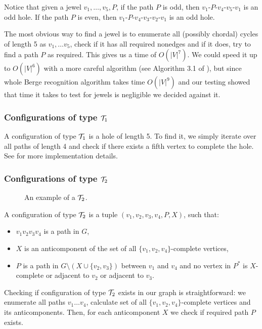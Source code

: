 Notice that given a jewel $v_1, \ldots, v_5, P$, if the path $P$ is odd, then $v_1$-$P$-$v_4$-$v_5$-$v_1$ is an odd hole. If the path $P$ is even, then $v_1$-$P$-$v_4$-$v_3$-$v_2$-$v_1$ is an odd hole.

The most obvious way to find a jewel is to enumerate all (possibly chordal) cycles of length 5 as $v_1, \ldots v_5$, check if it has all required nonedges and if it does, try to find a path $P$ as required. This gives us a time of $O(|V|^7)$. We could speed it up to $O(|V|^6)$ with a more careful algorithm (see Algorithm 3.1 of \cite{MC05}), but since whole Berge recognition algorithm takes time $O(|V|^9)$ and our testing showed that time it takes to test for jewels is negligible we decided against it.

\subsubsection{Configurations of type $\mathcal{T}_1$}

A configuration of type $\mathcal{T}_1$ is a hole of length 5. To find it, we simply iterate over all paths of length 4 and check if there exists a fifth vertex to complete the hole. See  for more implementation details.

\subsubsection{Configurations of type $\mathcal{T}_2$}

\begin{wrapfigure}{r}{0.35\textwidth}
	
	\caption{An example of a $\mathcal{T}_2$.}%
	\vspace{-.5cm}
\end{wrapfigure}

A configuration of type $\mathcal{T}_2$ is a tuple $(v_1, v_2, v_3, v_4, P, X)$, such that:
\begin{itemize}
	\item $v_1v_2v_3v_4$ is a path in $G$,
	\item $X$ is an anticomponent of the set of all $\{v_1, v_2, v_4\}$-complete vertices,
	\item $P$ is a path in $G\setminus(X \cup \{v_2, v_3\})$ between $v_1$ and $v_4$ and no vertex in $P^*$ is $X$-complete or adjacent to $v_2$ or adjacent to $v_3$.
\end{itemize}

Checking if configuration of type $\mathcal{T}_2$ exists in our graph is straightforward: we enumerate all paths $v_1\ldots v_4$, calculate set of all $\{v_1, v_2, v_4\}$-complete vertices and its anticomponents. Then, for each anticomponent $X$ we check if required path $P$ exists.

